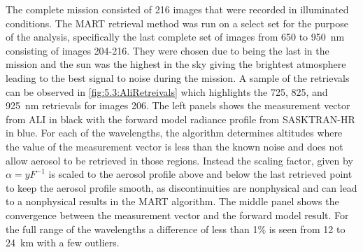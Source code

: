 The complete mission consisted of 216 images that were recorded in illuminated conditions. The MART retrieval method was run on a select set for the purpose of the analysis, specifically the last complete set of images from 650 to 950~nm consisting of images 204-216. They were chosen due to being the last in the mission and the sun was the highest in the sky giving the brightest atmosphere leading to the best signal to noise during the mission. A sample of the retrievals can be observed in \autoref{fig:5.3:AliRetreivals} which highlights the 725, 825, and 925~nm retrievals for images 206. The left panels shows the measurement vector from ALI in black with the forward model radiance profile from SASKTRAN-HR in blue. For each of the wavelengths, the algorithm determines altitudes where the value of the measurement vector is less than the known noise and does not allow aerosol to be retrieved in those regions. Instead the scaling factor, given by $\alpha = yF^{-1}$ is scaled to the aerosol profile above and below the last retrieved point to keep the aerosol profile smooth, as discontinuities are nonphysical and can lead to a nonphysical results in the MART algorithm. The middle panel shows the convergence between the measurement vector and the forward model result. For the full range of the wavelengths a difference of less than 1\% is seen from 12 to 24~km with a few outliers.

